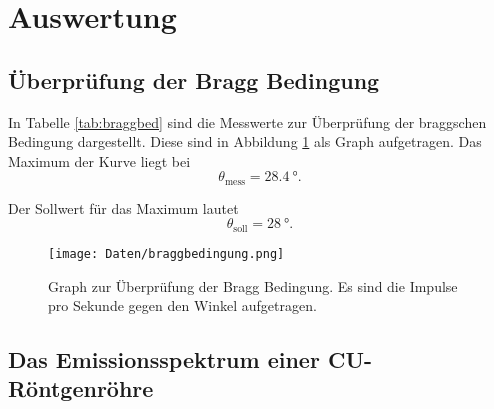 \section{Auswertung}
\label{sec:Auswertung}

\subsection{Überprüfung der Bragg Bedingung}

In Tabelle \ref{tab:braggbed} sind die Messwerte zur Überprüfung der braggschen
Bedingung dargestellt. Diese sind in Abbildung \ref{fig:braggbed} als Graph
aufgetragen.
Das Maximum der Kurve liegt bei
\begin{equation}
  \theta_\text{mess} = \SI{28.4}{\degree}.
\end{equation}

Der Sollwert für das Maximum lautet
\begin{equation}
  \theta_\text{soll} = \SI{28}{\degree}.
\end{equation}

\begin{figure}
  \centering
  \texttt{[image: Daten/braggbedingung.png]}
  \caption{Graph zur Überprüfung der Bragg Bedingung. Es sind die Impulse pro
  Sekunde gegen den Winkel aufgetragen.}
  \label{fig:braggbed}
\end{figure}

\subsection{Das Emissionsspektrum einer CU-Röntgenröhre}

